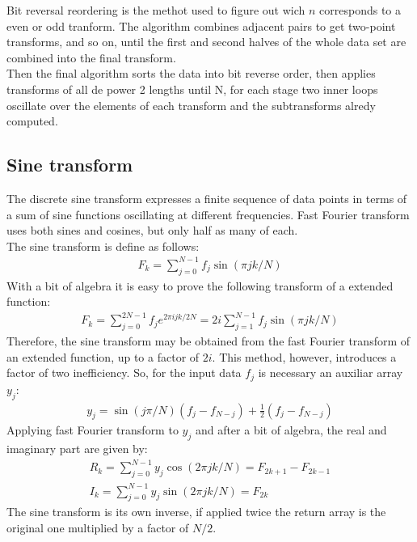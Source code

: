 \documentclass[letterpaper]{article}
\begin{document}
Bit reversal reordering is the methot used to figure out wich $n$ corresponds to a even or odd tranform. The algorithm combines adjacent pairs to get two-point transforms, and so on, until the first and second halves of the whole data set are combined into the final transform.\\
Then the final algorithm sorts the data into bit reverse order, then applies transforms of all de power 2 lengths until N, for each stage  two inner loops oscillate over the elements of each transform and the subtransforms alredy computed.

\subsection{Sine transform} 
The discrete sine transform expresses a finite sequence of data points in terms of a sum of sine functions oscillating at different frequencies. Fast Fourier transform uses both sines and cosines, but only half as many of each.\\
The sine transform is define as follows:
\begin{align}
F_k= \sum_{j=0}^{N-1}f_j \sin(\pi j k /N)	
\end{align}
With a bit of algebra it is easy to prove the following transform of a extended function:
\begin{align}
F_k=\sum_{j=0}^{2N-1}f_je^{2\pi i j k / 2N}= 2i\sum_{j=1}^{N-1}f_j \sin(\pi j k /N)	
\end{align}
Therefore, the sine transform may be obtained from the fast Fourier transform of  an extended function, up to a factor of $2i$. This method, however, introduces a factor of two inefficiency.	So, for the input data $f_j$ is necessary an auxiliar array $y_j$:
\begin{align}
y_j=\sin(j\pi /N)(f_j-f_{N-j})+\frac{1}{2}(f_j-f_{N-j})
\end{align}
Applying fast Fourier transform to $y_j$ and after a bit of algebra, the real and imaginary part are given by:
\begin{align}
R_k=\sum_{j=0}^{N-1}y_j\cos(2\pi jk/N)=F_{2k+1}-F_{2k-1}\\
I_k=\sum_{j=0}^{N-1}y_j\sin(2\pi jk/N)=F_{2k}
\end{align}
The sine transform is its own inverse, if applied twice the return array is the original one multiplied by a factor  of $N/2$.
\end{document}
